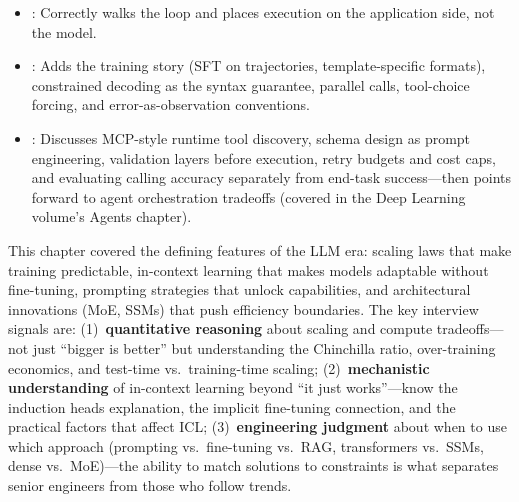 \begin{interviewq}

\goodgreat
\begin{itemize}
\item {}: Correctly walks the loop and places execution on the
  application side, not the model.
\item {}: Adds the training story (SFT on trajectories,
  template-specific formats), constrained decoding as the syntax guarantee,
  parallel calls, tool-choice forcing, and error-as-observation
  conventions.
\item {}: Discusses MCP-style runtime tool discovery, schema
  design as prompt engineering, validation layers before execution, retry
  budgets and cost caps, and evaluating calling accuracy separately from
  end-task success---then points forward to agent orchestration tradeoffs
  (covered in the Deep Learning volume's Agents chapter).
\end{itemize}

\end{interviewq}

\bigskip
\begin{keyinsight}
This chapter covered the defining features of the LLM era: scaling laws that
make training predictable, in-context learning that makes models adaptable
without fine-tuning, prompting strategies that unlock capabilities, and
architectural innovations (MoE, SSMs) that push efficiency boundaries.  The
key interview signals are: (1)~\textbf{quantitative reasoning} about scaling
and compute tradeoffs---not just ``bigger is better'' but understanding the
Chinchilla ratio, over-training economics, and test-time vs.\ training-time
scaling; (2)~\textbf{mechanistic understanding} of in-context learning beyond
``it just works''---know the induction heads explanation, the implicit
fine-tuning connection, and the practical factors that affect ICL;
(3)~\textbf{engineering judgment} about when to use which approach (prompting
vs.\ fine-tuning vs.\ RAG, transformers vs.\ SSMs, dense vs.\ MoE)---the
ability to match solutions to constraints is what separates senior engineers
from those who follow trends.
\end{keyinsight}

